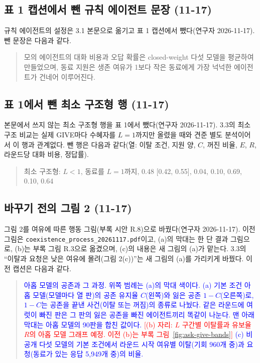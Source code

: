 \subsection{표 1 캡션에서 뺀 규칙 에이전트 문장 (11-17)}\label{app:construct-moved-31}

규칙 에이전트의 설정은 3.1 본문으로 옮기고 표 1 캡션에서 뺐다(연구자 2026-11-17). 뺀 문장은 다음과 같다.

\begin{quote}\small
모의 에이전트의 대화 비용과 오답 확률은 closed-weight 다섯 모델을 평균하여 만들었으며, 동료 지원은 생존 여유가 1보다 작은 동료에게 가장 넉넉한 에이전트가 건네어 이루어진다.
\end{quote}

\subsection{표 1에서 뺀 최소 구조형 행 (11-17)}\label{app:construct-moved-32}

본문에서 쓰지 않는 최소 구조형 행을 표 1에서 뺐다(연구자 2026-11-17). 3.3의 최소 구조 비교는 실제 GIVE마다 수혜자를 $L=1$까지만 올렸을 때와 견준 별도 분석이어서 이 행과 관계없다. 뺀 행은 다음과 같다(열: 이탈 조건, 지원 양, $C$, 꺼진 비율, $E$, $R$, 라운드당 대화 비용, 정답률).

\begin{quote}\small
최소 구조형: $L<1$, 동료를 $L=1$까지, 0.48 [0.42, 0.55], 0.04, 0.10, 0.69, 0.10, 0.64
\end{quote}

\subsection{바꾸기 전의 그림 2 (11-17)}\label{app:construct-moved-33}

그림 2를 여유에 따른 행동 그림(부록 시안 R.8)으로 바꿨다(연구자 2026-11-17). 이전 그림은 \texttt{coexistence\_process\_20261117.pdf}이고, (a)의 막대는 한 단 결과 그림으로, (b)는 부록 그림 R.3으로 옮겼으며, (c)의 내용은 새 그림의 (a)가 맡는다. 3.3의 ``이탈과 요청은 낮은 여유에 몰려(그림 2(c))''는 새 그림의 (a)를 가리키게 바꿨다. 이전 캡션은 다음과 같다.

\begin{quote}\small
{\textcolor{blue}{아홉 모델의 공존과 그 과정. 위쪽 범례는 (a)의 막대 색이다. (a) 기본 조건 아홉 모델(모델마다 열 판)의 공존 유지율 $C$(왼쪽)와 잃은 공존 $1-C$(오른쪽)로, $1-C$는 공존을 끝낸 사건(이탈 또는 꺼짐)의 종류로 나눴다. 같은 라운드에 여럿이 빠진 판은 그 판의 잃은 공존을 빠진 에이전트끼리 똑같이 나눈다. 맨 아래 막대는 아홉 모델의 90판을 합친 값이다. \textcolor{red}{[(b) 자리: $L$ 구간별 이탈률과 유보율 $R$의 아홉 모델 그래프 예정. 이전 (b)는 부록 그림~\ref{fig:ask-give-bands}]} (c) 비공개 다섯 모델의 기본 조건에서 라운드 시작 여유별 이탈(기회 960개 중)과 요청(동료가 있는 응답 5,949개 중)의 비율.}}
\end{quote}

